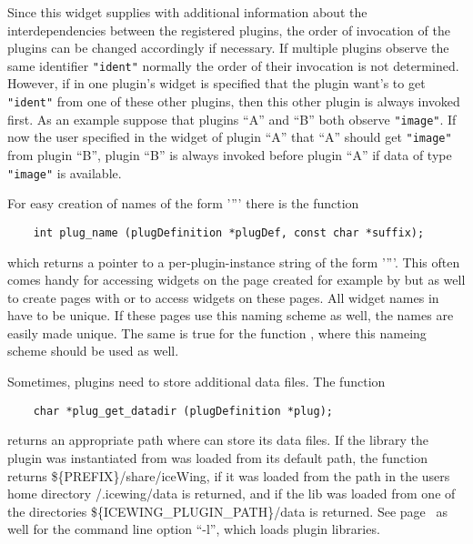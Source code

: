 Since this widget supplies \icewing{} with additional information
about the interdependencies between the registered plugins, the
order of invocation of the plugins can be changed accordingly if
necessary. If multiple plugins observe the same identifier
\verb|"ident"| normally the order of their invocation is not
determined. However, if in one plugin's
 widget is specified that the plugin
want's to get \verb|"ident"| from one of these other plugins, then
this other plugin is always invoked first. As an example suppose
that plugins ``A'' and ``B'' both observe \verb|"image"|. If now the
user specified in the widget of plugin ``A'' that ``A'' should get
\verb|"image"| from plugin ``B'', plugin ``B'' is always invoked
before plugin ``A'' if data of type \verb|"image"| is available.

For easy creation of names of the form
'''' 
there is the function
\begin{small}
\linespread{0.9}
\begin{verbatim}
    int plug_name (plugDefinition *plugDef, const char *suffix);
\end{verbatim}
\end{small}
which returns a pointer to a per-plugin-instance string of the
form ''''. This often comes handy for
accessing widgets on the page created for example by
 but as well to create pages with
 or to access widgets on these pages. All
widget names in \icewing{} have to be unique. If these pages use
this naming scheme as well, the names are easily made unique. The
same is true for the function , where this
nameing scheme should be used as well.

Sometimes, plugins need to store additional data files. The
function
\begin{small}
\linespread{0.9}
\begin{verbatim}
    char *plug_get_datadir (plugDefinition *plug);
\end{verbatim}
\end{small}
returns an appropriate path where  can store its data
files. If the library the plugin was instantiated from was loaded
from its default path, the function returns
\$\{PREFIX\}/share/iceWing, if it was loaded from the \icewing{} path
in the users home directory \urltilde{}/.icewing/data is
returned, and if the lib was loaded from one of the
 directories
\$\{ICEWING\_PLUGIN\_PATH\}/data is returned. See
page~ as well for the \icewing{} command
line option ``-l'', which loads plugin libraries.

